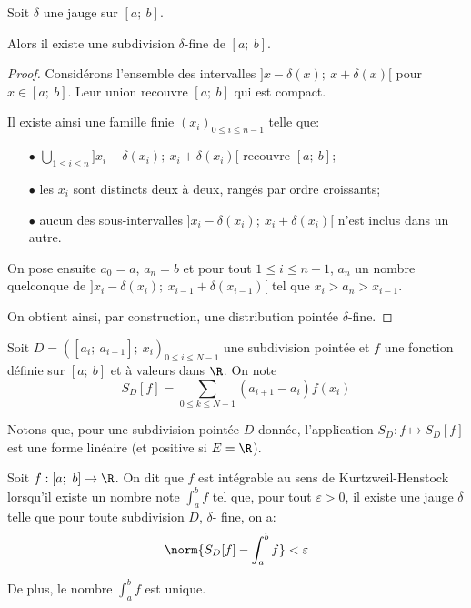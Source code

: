 \begin{lem}
Soit $\delta$ une jauge sur $[a;~b]$.

Alors il existe une subdivision $\delta$-fine de $[a;~b]$.
\end{lem}

\begin{proof}
Considérons l'ensemble des intervalles $]x-\delta(x);~x+\delta(x)[$ pour $x \in [a;~b]$. Leur union recouvre $[a;~b]$ qui est compact.

Il existe ainsi une famille finie $(x_i)_{0 \leq i \leq n-1}$ telle que:
\begin{itemize}
\item[$\bullet$]
$\bigcup \limits_{1 \leq i \leq n} ]x_i-\delta(x_i);~x_i+\delta(x_i)[$ recouvre $[a;~b]$;
\item[$\bullet$]
les $x_i$ sont distincts deux à deux, rangés par ordre croissants;
\item[$\bullet$]
aucun des sous-intervalles $]x_i-\delta(x_i);~x_i+\delta(x_i)[$ n'est inclus dans un autre.
\end{itemize}

On pose ensuite $a_0 =a$, $a_n = b$ et pour tout $1 \leq i \leq n-1$, $a_n$ un nombre quelconque de $]x_{i}-\delta(x_{i});~x_{i-1}+\delta(x_{i-1})[$ tel que $x_i>a_n>x_{i-1}$.

On obtient ainsi, par construction, une distribution pointée $\delta$-fine.
\end{proof}

\begin{de}
Soit $D = ([a_i;~a_{i+1}];~x_i)_{0 \leq i \leq N-1}$ une subdivision pointée et $f$ une fonction définie sur $[a;~b]$ et à valeurs dans $\R$. On note 
\[
S_D[f] = \displaystyle{\sum \limits_{0 \leq k \leq N-1}} (a_{i+1}-a_i) f(x_i)
\]
\end{de}


Notons que, pour une subdivision pointée $D$ donnée, l'application $S_D: f \mapsto S_D[f]$ est une forme linéaire (et positive si $E = \R$).

\begin{de}
Soit $f: [a;~b] \to \R$. On dit que $f$ est intégrable au sens de Kurtzweil-Henstock lorsqu'il existe un nombre note $\int_a^b f$ tel que, pour tout $\varepsilon>0$, il existe une jauge $\delta$ telle que pour toute subdivision $D$, $\delta$- fine, on a:
\[
\norm{S_D[f]-\int_a^b f} < \varepsilon
\]

De plus, le nombre $\int_a^b f$ est unique.
\end{de}

